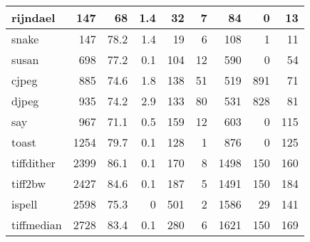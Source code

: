 \begin{tabular}{|l|r|r|r|r|r|r|r|r|}
\hline
 rijndael        &      147 &     68   &    1.4 &   32 &    7 &     84 &     0 &    13 \\
\hline
 snake           &      147 &     78.2 &    1.4 &   19 &    6 &    108 &     1 &    11 \\
\hline
 susan           &      698 &     77.2 &    0.1 &  104 &   12 &    590 &     0 &    54 \\
\hline
 cjpeg           &      885 &     74.6 &    1.8 &  138 &   51 &    519 &   891 &    71 \\
\hline
 djpeg           &      935 &     74.2 &    2.9 &  133 &   80 &    531 &   828 &    81 \\
\hline
 say             &      967 &     71.1 &    0.5 &  159 &   12 &    603 &     0 &   115 \\
\hline
 toast           &     1254 &     79.7 &    0.1 &  128 &    1 &    876 &     0 &   125 \\
\hline
 tiffdither      &     2399 &     86.1 &    0.1 &  170 &    8 &   1498 &   150 &   160 \\
\hline
 tiff2bw         &     2427 &     84.6 &    0.1 &  187 &    5 &   1491 &   150 &   184 \\
\hline
 ispell          &     2598 &     75.3 &    0   &  501 &    2 &   1586 &    29 &   141 \\
\hline
 tiffmedian      &     2728 &     83.4 &    0.1 &  280 &    6 &   1621 &   150 &   169 \\
\hline
\end{tabular}


